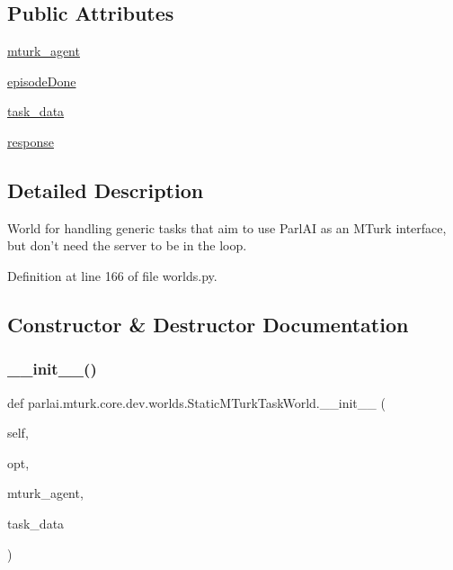 \subsection*{Public Attributes}
\begin{DoxyCompactItemize}
\item 
\hyperlink{classparlai_1_1mturk_1_1core_1_1dev_1_1worlds_1_1StaticMTurkTaskWorld_aab38e48f7fd04122213d70e5b9c0786c}{mturk\+\_\+agent}
\item 
\hyperlink{classparlai_1_1mturk_1_1core_1_1dev_1_1worlds_1_1StaticMTurkTaskWorld_a9d5943473ba788a5bf6cf6f439d9a2b8}{episode\+Done}
\item 
\hyperlink{classparlai_1_1mturk_1_1core_1_1dev_1_1worlds_1_1StaticMTurkTaskWorld_a18b4236bb2e5867aeb7a6d3c846712ac}{task\+\_\+data}
\item 
\hyperlink{classparlai_1_1mturk_1_1core_1_1dev_1_1worlds_1_1StaticMTurkTaskWorld_ac6d8c12abc3a318337ab68b546631c79}{response}
\end{DoxyCompactItemize}


\subsection{Detailed Description}
\begin{DoxyVerb}World for handling generic tasks that aim to use ParlAI as an MTurk interface, but
don't need the server to be in the loop.
\end{DoxyVerb}
 

Definition at line 166 of file worlds.\+py.



\subsection{Constructor \& Destructor Documentation}
\mbox{\label{classparlai_1_1mturk_1_1core_1_1dev_1_1worlds_1_1StaticMTurkTaskWorld_aaa2fbb9c20a2a3fb4e7bb795ba2391fa}} 
\subsubsection{\texorpdfstring{\+\_\+\+\_\+init\+\_\+\+\_\+()}{\_\_init\_\_()}}
{\footnotesize\ttfamily def parlai.\+mturk.\+core.\+dev.\+worlds.\+Static\+M\+Turk\+Task\+World.\+\_\+\+\_\+init\+\_\+\+\_\+ (\begin{DoxyParamCaption}\item[{}]{self,  }\item[{}]{opt,  }\item[{}]{mturk\+\_\+agent,  }\item[{}]{task\+\_\+data }\end{DoxyParamCaption})}

